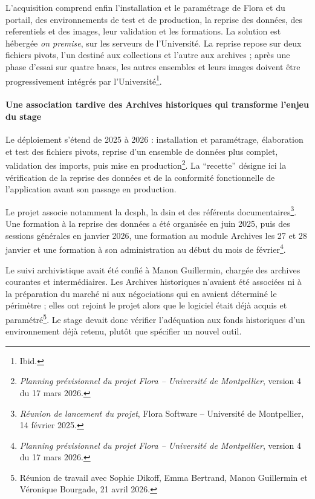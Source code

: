 L'acquisition comprend enfin l'installation et le paramétrage de Flora et du portail, des environnements de test et de production, la reprise des données, des \glspl{referentiel} et des images, leur validation et les formations. La solution est hébergée \emph{on premise}, sur les serveurs de l'Université. La reprise repose sur deux fichiers pivots, l'un destiné aux collections et l'autre aux archives ; après une phase d'essai sur quatre bases, les autres ensembles et leurs images doivent être progressivement intégrés par l'Université\footnote{Ibid.}.

\paragraph{Une association tardive des Archives historiques qui transforme l'enjeu du stage}

Le déploiement s'étend de 2025 à 2026 : installation et paramétrage, élaboration et test des fichiers pivots, reprise d'un ensemble de données plus complet, validation des imports, puis mise en production\footnote{\emph{Planning prévisionnel du projet Flora -- Université de Montpellier}, version 4 du 17 mars 2026.}. La \enquote{recette} désigne ici la vérification de la reprise des données et de la conformité fonctionnelle de l'application avant son passage en production.

Le projet associe notamment la \gls{dcsph}, la \gls{dsin} et des référents documentaires\footnote{\emph{Réunion de lancement du projet}, Flora Software -- Université de Montpellier, 14 février 2025.}. Une formation à la reprise des données a été organisée en juin 2025, puis des sessions générales en janvier 2026, une formation au module Archives les 27 et 28 janvier et une formation à son administration au début du mois de février\footnote{\emph{Planning prévisionnel du projet Flora -- Université de Montpellier}, version 4 du 17 mars 2026.}.

Le suivi archivistique avait été confié à Manon Guillermin, chargée des archives courantes et intermédiaires. Les Archives historiques n'avaient été associées ni à la préparation du marché ni aux négociations qui en avaient déterminé le périmètre ; elles ont rejoint le projet alors que le logiciel était déjà acquis et paramétré\footnote{Réunion de travail avec Sophie Dikoff, Emma Bertrand, Manon Guillermin et Véronique Bourgade, 21 avril 2026.}. Le stage devait donc vérifier l'adéquation aux fonds historiques d'un environnement déjà retenu, plutôt que spécifier un nouvel outil.



